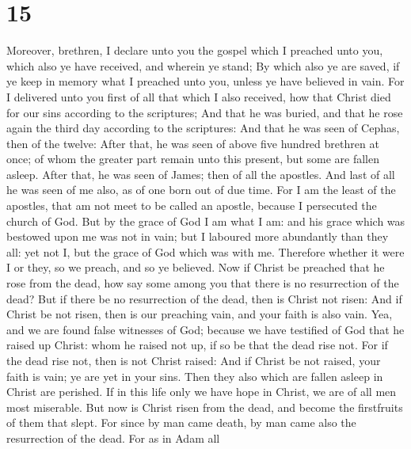 \hypertarget{section-14}{%
\section{15}\label{section-14}}

 Moreover, brethren, I declare unto you the gospel which I
preached unto you, which also ye have received, and wherein ye stand;
 By which also ye are saved, if ye keep in memory what I
preached unto you, unless ye have believed in vain.  For I
delivered unto you first of all that which I also received, how that
Christ died for our sins according to the scriptures;  And
that he was buried, and that he rose again the third day according to
the scriptures:  And that he was seen of Cephas, then of
the twelve:  After that, he was seen of above five hundred
brethren at once; of whom the greater part remain unto this present, but
some are fallen asleep.  After that, he was seen of James;
then of all the apostles.  And last of all he was seen of
me also, as of one born out of due time.  For I am the
least of the apostles, that am not meet to be called an apostle, because
I persecuted the church of God.  But by the grace of God
I am what I am: and his grace which was bestowed upon me was not in
vain; but I laboured more abundantly than they all: yet not I, but the
grace of God which was with me.  Therefore whether it
were I or they, so we preach, and so ye believed.  Now if
Christ be preached that he rose from the dead, how say some among you
that there is no resurrection of the dead?  But if there
be no resurrection of the dead, then is Christ not risen:
 And if Christ be not risen, then is our preaching vain,
and your faith is also vain.  Yea, and we are found false
witnesses of God; because we have testified of God that he raised up
Christ: whom he raised not up, if so be that the dead rise not.
 For if the dead rise not, then is not Christ raised:
 And if Christ be not raised, your faith is vain; ye are
yet in your sins.  Then they also which are fallen asleep
in Christ are perished.  If in this life only we have
hope in Christ, we are of all men most miserable.  But
now is Christ risen from the dead, and become the firstfruits of them
that slept.  For since by man came death, by man came
also the resurrection of the dead.  For as in Adam all
